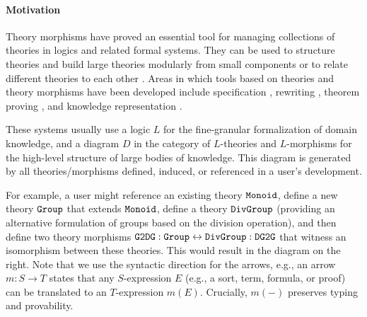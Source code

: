 \paragraph{Motivation}
Theory morphisms have proved an essential tool for managing collections of theories in logics and related formal systems.
They can be used to structure theories and build large theories modularly from small components or to relate different theories to each other \cite{asl,devgraphs,littletheories}.
Areas in which tools based on theories and theory morphisms have been developed include specification \cite{obj,hets}, rewriting \cite{maude}, theorem proving \cite{imps}, and knowledge representation \cite{RK:mmt:10}.


These systems usually use a logic $L$ for the fine-granular formalization of domain knowledge, and a diagram $D$ in the category of $L$-theories and $L$-morphisms for the high-level structure of large bodies of knowledge.
This diagram is generated by all theories/morphisms defined, induced, or referenced in a user's development.

\begin{wrapfigure}{r}{5.5cm}
\vspace{-3em}
\vspace{-3.5em}
\end{wrapfigure}

For example, a user might reference an existing theory $\operatorname{\mathtt{Monoid}}$, define a new theory $\operatorname{\mathtt{Group}}$ that extends $\operatorname{\mathtt{Monoid}}$, define a theory $\operatorname{\mathtt{DivGroup}}$ (providing an alternative formulation of groups based on the division operation), and then define two theory morphisms $\operatorname{\mathtt{G2DG}}:\operatorname{\mathtt{Group}}\leftrightarrow \operatorname{\mathtt{DivGroup}}:\operatorname{\mathtt{DG2G}}$ that witness an isomorphism between these theories.
This would result in the diagram on the right.
Note that we use the syntactic direction for the arrows, e.g., an arrow $m:S\to T$ states that any $S$-expression $E$ (e.g., a sort, term, formula, or proof) can be translated to an $T$-expression $m(E)$.
Crucially, $m(-)$ preserves typing and provability.

